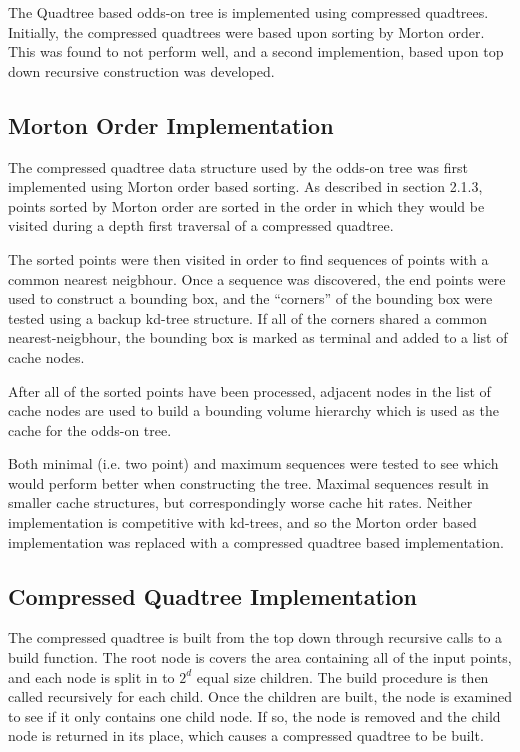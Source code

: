 \documentclass[mcs]{scsthesis}
\begin{document}
The Quadtree based odds-on tree is implemented using compressed quadtrees.
Initially, the compressed quadtrees were based upon sorting by Morton order.
This was found to not perform well, and a second implemention, based upon top
down recursive construction was developed.

\subsection{Morton Order Implementation}

The compressed quadtree data structure used by the odds-on tree was first
implemented using Morton order based sorting. As described in section 2.1.3,
points sorted by Morton order are sorted in the order in which they would be
visited during a depth first traversal of a compressed quadtree.

The sorted points were then visited in order to find sequences of points with
a common nearest neigbhour. Once a sequence was discovered, the end points
were used to construct a bounding box, and the ``corners'' of the bounding box
were tested using a backup kd-tree structure. If all of the corners shared a
common nearest-neigbhour, the bounding box is marked as terminal and added to
a list of cache nodes.

After all of the sorted points have been processed, adjacent nodes in the list
of cache nodes are used to build a bounding volume hierarchy which is used as
the cache for the odds-on tree.

Both minimal (i.e. two point) and maximum sequences were tested to see which
would perform better when constructing the tree. Maximal sequences result in
smaller cache structures, but correspondingly worse cache hit rates. Neither
implementation is competitive with kd-trees, and so the Morton order based
implementation was replaced with a compressed quadtree based implementation.

\subsection{Compressed Quadtree Implementation}

The compressed quadtree is built from the top down through recursive calls to a
build function. The root node is covers the area containing all of the input
points, and each node is split in to \(2^d\) equal size children. The build
procedure is then called recursively for each child. Once the children are
built, the node is examined to see if it only contains one child node. If so,
the node is removed and the child node is returned in its place, which causes
a compressed quadtree to be built.
\end{document}
